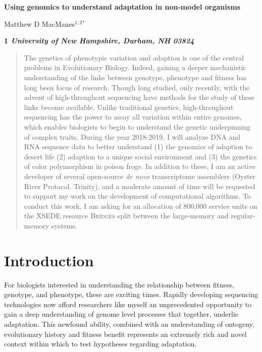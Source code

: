 \documentclass[10.5pt]{article}
\begin{document}
\begin{flushleft}
{\large
\textbf{Using genomics to understand adaptation in non-model organisms }
}

\vspace{8mm}

\noindent
Matthew D MacManes$^{1,2}$$^\ast$\\
\vspace{4mm}


\bf{1} \textnormal{\em{University of New Hampshire, Durham, NH 03824}}  \\


\end{flushleft}
\vspace{8mm}


\begin{abstract}
The genetics of phenotypic variation and adaption is one of the central problems in Evolutionary Biology. Indeed, gaining a deeper mechanistic understanding of the links between genotype, phenotype and fitness has long been focus of research.  Though long studied, only recently, with the advent of high-throughout sequencing have methods for the study of these links become available. Unlike traditional genetics, high-throughout sequencing has the power to assay all variation within entire genomes, which enables biologists to begin to understand the genetic underpinning of complex traits. During the year 2018-2019, I will analyze DNA and RNA sequence data to better understand (1) the genomics of adaption to desert life (2) adaption to a unique social environment and (3) the genetics of color polymorphism in poison frogs. In addition to these, I am an active developer of several open-source \textit{de novo} transcriptome assemblers (Oyster River Protocol. Trinity), and a moderate amount of time will be requested to support my work on the development of computational algorithms.  To conduct this work, I am asking for an allocation of 800,000 service units on the XSEDE resource \textsc{Bridges} split between the large-memory and regular-memory systems.  


\end{abstract}

\doublespacing
\linenumbers

\vspace{12mm}

\section*{Introduction}
For biologists interested in understanding the relationship between fitness, genotype, and phenotype, these are exciting times. Rapidly developing sequencing technologies now afford researchers like myself an unprecedented opportunity to gain a deep understanding of genome level processes that together, underlie adaptation.  This newfound ability, combined with an understanding of ontogeny, evolutionary history and fitness benefit represents an extremely rich and novel context within which to test hypotheses regarding adaptation.  \\
\end{document}
